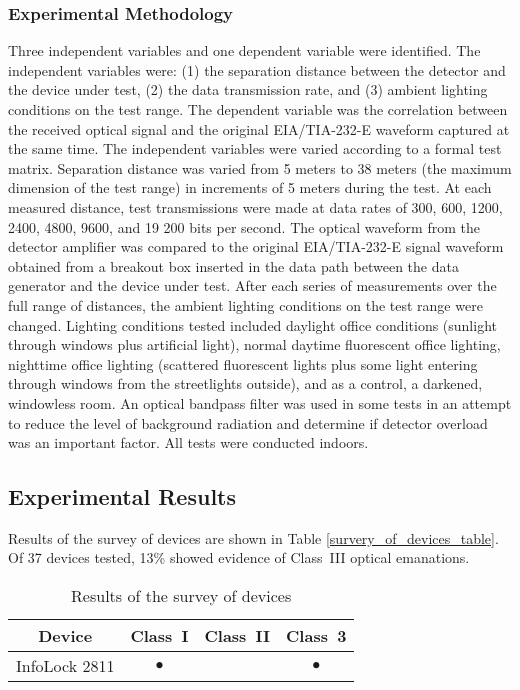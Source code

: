 \documentclass[twocolumn]{article}
\begin{document}
\subsubsection{Experimental Methodology}

Three independent variables and one dependent variable were identified. The independent variables were: (1) the separation distance between the detector and the device under test, (2) the data transmission rate, and (3) ambient lighting conditions on the test range.  The dependent variable was the correlation between the received optical signal and the original EIA/TIA-232-E waveform captured at the same time.  The independent variables were varied according to a formal test matrix.  Separation distance was varied from 5 meters to 38 meters (the maximum dimension of the test range) in increments of 5 meters during the test.  At each measured distance, test transmissions were made at data rates of 300, 600, 1200, 2400, 4800, 9600, and 19 200 bits per second.  The optical waveform from the detector amplifier was compared to the original EIA/TIA-232-E signal waveform obtained from a breakout box inserted in the data path between the data generator and the device under test.  After each series of measurements over the full range of distances, the ambient lighting conditions on the test range were changed.  Lighting conditions tested included daylight office conditions (sunlight through windows plus artificial light), normal daytime fluorescent office lighting, nighttime office lighting (scattered fluorescent lights plus some light entering through windows from the streetlights outside), and as a control, a darkened, windowless room.  An optical bandpass filter was used in some tests in an attempt to reduce the level of background radiation and determine if detector overload was an important factor.  All tests were conducted indoors.

\subsection{Experimental Results}

Results of the survey of devices are shown in Table \ref{survery_of_devices_table}.  Of 37 devices tested, 13\% showed evidence of Class~III optical emanations.

\begin{table}[htbp]
\centering
\caption{Results of the survey of devices}
\label{survey_of_devices_table}
\begin{tabular}{|c|c|c|c|}
\hline
Device & Class~I & Class~II & Class~3 \\
\hline
InfoLock 2811 & $\bullet$ & \mbox{ } & $\bullet$ \\
\hline
\end{tabular}
\end{table}
\end{document}

